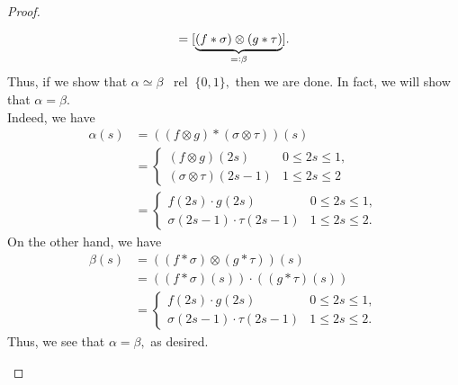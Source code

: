 \documentclass[12pt]{article}
\theoremstyle{definition}
\numberwithin{thm}{section}
\newcommand{\rel}{\;\;\operatorname{rel}\;}
\begin{document}
\begin{proof}
\begin{enumerate}
		\begin{equation*} 
			[\underbrace{(f \otimes g)*(\sigma \otimes \tau)}_{=\vcentcolon \alpha}] = [\underbrace{(f * \sigma) \otimes (g * \tau)}_{=\vcentcolon\beta}].
		\end{equation*}
		Thus, if we show that $\alpha \simeq \beta \rel \{0, 1\},$ then we are done. In fact, we will show that $\alpha = \beta.$\\
		Indeed, we have
		\begin{align*} 
			\alpha(s) &= \left((f \otimes g)*(\sigma \otimes \tau)\right)(s)\\
			&= \begin{cases}
				(f\otimes g)(2s) & 0 \le 2s \le 1,\\
				(\sigma \otimes \tau)(2s - 1) & 1 \le 2s \le 2
			\end{cases}\\
			&= \begin{cases}
				f(2s)\cdot g(2s) & 0 \le 2s \le 1,\\
				\sigma(2s - 1)\cdot\tau(2s - 1) & 1 \le 2s \le 2.
			\end{cases}
		\end{align*}
		On the other hand, we have
		\begin{align*} 
			\beta(s) &= \left((f * \sigma) \otimes (g * \tau)\right)(s)\\
			&= \left((f*\sigma)(s)\right)\cdot\left((g*\tau)(s)\right)\\
			&= \begin{cases}
				f(2s)\cdot g(2s) & 0 \le 2s \le 1,\\
				\sigma(2s - 1)\cdot\tau(2s - 1) & 1 \le 2s \le 2.
			\end{cases}
		\end{align*}
		Thus, we see that $\alpha = \beta,$ as desired. \qedhere
	\end{enumerate}
\end{proof}
\end{document}
